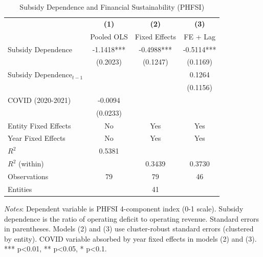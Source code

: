 \begin{table}[htbp]
\centering
\caption{Subsidy Dependence and Financial Sustainability (PHFSI)}
\label{tab:subsidy_phfsi}
\begin{tabular}{lccc}
\toprule
& \textbf{(1)} & \textbf{(2)} & \textbf{(3)} \\
& Pooled OLS & Fixed Effects & FE + Lag \\
\midrule
Subsidy Dependence & -1.1418*** & -0.4988*** & -0.5114*** \\
& (0.2023) & (0.1247) & (0.1169) \\
Subsidy Dependence$_{t-1}$ &  &  & 0.1264 \\
&  &  & (0.1156) \\
COVID (2020-2021) & -0.0094 &  &  \\
& (0.0233) &  &  \\
\midrule
Entity Fixed Effects & No & Yes & Yes \\
Year Fixed Effects & No & Yes & Yes \\
\midrule
$R^2$ & 0.5381 &  &  \\
$R^2$ (within) &  & 0.3439 & 0.3730 \\
Observations & 79 & 79 & 46 \\
Entities &  & 41 &  \\
\bottomrule
\end{tabular}
\begin{tablenotes}
\footnotesize
\item \textit{Notes}: Dependent variable is PHFSI 4-component index (0-1 scale). Subsidy dependence is the ratio of operating deficit to operating revenue. Standard errors in parentheses. Models (2) and (3) use cluster-robust standard errors (clustered by entity). COVID variable absorbed by year fixed effects in models (2) and (3). *** p<0.01, ** p<0.05, * p<0.1.
\end{tablenotes}
\end{table}
